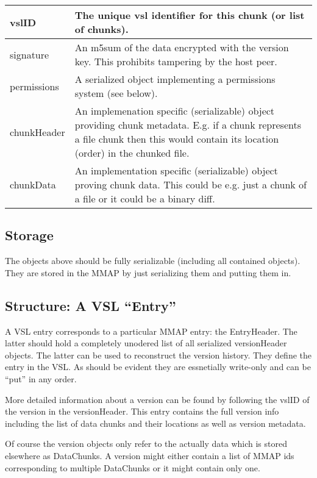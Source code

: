\documentclass[10pt]{article}
\begin{document}
\begin{tabular}{|l|p{12cm}|}
\hline
vslID & The unique vsl identifier for this chunk (or list of chunks).\\
\hline
signature & An m5sum of the data encrypted with the version key.  This prohibits tampering by the host peer.\\
\hline
permissions & A serialized object implementing a permissions system (see below).\\
\hline
chunkHeader & An implemenation specific (serializable) object providing chunk metadata.  E.g. if a chunk represents a file chunk then this would contain its location (order) in the chunked file.\\
\hline
chunkData & An implementation specific (serializable) object proving chunk data.  This could be e.g. just a chunk of a file or it could be a binary diff.\\
\hline
\end{tabular}


\subsection{Storage}

The objects above should be fully serializable (including all contained objects).  They are stored in the MMAP by just serializing them and putting them in.


\subsection{Structure: A VSL ``Entry''}

A VSL entry corresponds to a particular MMAP entry: the EntryHeader.  The latter
should hold a completely unodered list of all serialized versionHeader objects.
The latter can be used to reconstruct the version history.  They define the
entry in the VSL.  As should be evident they are essnetially write-only and can
be ``put'' in any order.  

More detailed information about a version can be found by following the vslID of
the version in the versionHeader.  This entry contains the full version info
including the list of data chunks and their locations as well as version
metadata.

Of course the version objects only refer to the actually data which is stored
elsewhere as DataChunks. A version might either contain a list of MMAP ids
corresponding to multiple DataChunks or it might contain only one.
\end{document}
